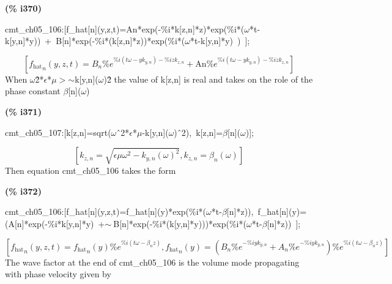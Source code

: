 \documentclass[fleqn]{article}
\begin{document}
\noindent
\begin{minipage}[t]{4.000000em}\color{red}\bfseries
(\% i370)	
\end{minipage}
\begin{minipage}[t]{\textwidth}\color{blue}
cmt\_ch05\_106:[f\_hat[n](y,z,t)=An*exp(-\%i*k[z,n]*z)*exp(\%i*(\ensuremath{\omega}*t-k[y,n]*y))\ +\ B[n]*exp(-\%i*(k[z,n]*z))*exp(\%i*(\ensuremath{\omega}*t-k[y,n]*y)\ )\ ];
\end{minipage}
\[\displaystyle \tag{\% o370} 
\left[ {{{f_{\ensuremath{\mathrm{hat}}}}}_n}\left( y\operatorname{,}z\operatorname{,}t\right) ={B_n} {{\% e}^{\% i \left( t \omega -y {k_{y,n}}\right) -\% i z {k_{z,n}}}}+\ensuremath{\mathrm{An}} {{\% e}^{\% i \left( t \omega -y {k_{y,n}}\right) -\% i z {k_{z,n}}}}\right] \mbox{}
\]
When \ensuremath{\omega}\^ 2*\ensuremath{\epsilon}*\ensuremath{\mu}\ensuremath{>}\ensuremath{\sim }k[y,n](\ensuremath{\omega})\^ 2 the value of k[z,n] is real and takes on the role of the phase constant \ensuremath{\beta}[n](\ensuremath{\omega})


\noindent
\begin{minipage}[t]{4.000000em}\color{red}\bfseries
(\% i371)	
\end{minipage}
\begin{minipage}[t]{\textwidth}\color{blue}
cmt\_ch05\_107:[k[z,n]=sqrt(\ensuremath{\omega}\^\ 2*\ensuremath{\epsilon}*\ensuremath{\mu}-k[y,n](\ensuremath{\omega})\^\ 2),\ k[z,n]=\ensuremath{\beta}[n](\ensuremath{\omega})];
\end{minipage}
\[\displaystyle \tag{\% o371} 
\left[ {k_{z,n}}=\sqrt{\epsilon  \mu  {{\omega }^{2}}-{{{k_{y,n}}\left( \omega \right) }^{2}}}\operatorname{,}{k_{z,n}}={{\beta }_n}\left( \omega \right) \right] \mbox{}
\]
Then equation cmt\_ch05\_106 takes the form


\noindent
\begin{minipage}[t]{4.000000em}\color{red}\bfseries
(\% i372)	
\end{minipage}
\begin{minipage}[t]{\textwidth}\color{blue}
cmt\_ch05\_106:[f\_hat[n](y,z,t)=f\_hat[n](y)*exp(\%i*(\ensuremath{\omega}*t-\ensuremath{\beta}[n]*z)),\ f\_hat[n](y)=(A[n]*exp(-\%i*k[y,n]*y)\ +\ensuremath{\sim\ }B[n]*exp(-\%i*(k[y,n]*y)))*exp(\%i*(\ensuremath{\omega}*t-\ensuremath{\beta}[n]*z))\ ];
\end{minipage}
\[\displaystyle \tag{\% o372} 
\operatorname{[}{{{f_{\ensuremath{\mathrm{hat}}}}}_n}\left( y\operatorname{,}z\operatorname{,}t\right) ={{{f_{\ensuremath{\mathrm{hat}}}}}_n}(y) {{\% e}^{\% i \left( t \omega -{{\beta }_n} z\right) }}\operatorname{,}{{{f_{\ensuremath{\mathrm{hat}}}}}_n}(y)=\left( {B_n} {{\% e}^{-\% i y {k_{y,n}}}}+{A_n} {{\% e}^{-\% i y {k_{y,n}}}}\right) {{\% e}^{\% i \left( t \omega -{{\beta }_n} z\right) }}\operatorname{]}\mbox{}
\]
The wave factor at the end of cmt\_ch05\_106 is the volume mode propagating with phase velocity given by
\end{document}

